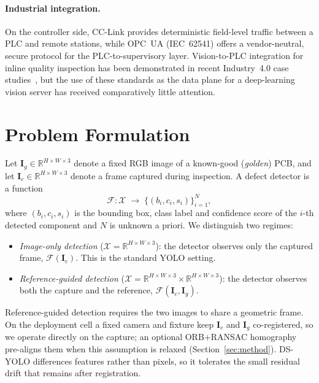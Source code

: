 \documentclass[conference]{IEEEtran}
\newcommand{\R}{\mathbb{R}}
\newcommand{\Igolden}{\mathbf{I}_{\!g}}
\newcommand{\Icap}{\mathbf{I}_{\!c}}
\newcommand{\Net}{\mathcal{F}}
\begin{document}
\paragraph*{Industrial integration.}
On the controller side, CC-Link
\cite{mitsubishi_qj61bt11n_manual} provides deterministic field-level
traffic between a PLC and remote stations, while OPC~UA (IEC~62541)
\cite{iec62541} offers a vendor-neutral, secure protocol for the
PLC-to-supervisory layer. Vision-to-PLC integration for inline quality inspection
has been demonstrated in recent Industry~4.0 case
studies~\cite{maslanka2025visionplc,velesaca2025opcuaml}, but the use of these
standards as the data plane for a deep-learning vision server has received
comparatively little attention.

\section{Problem Formulation}
\label{sec:formulation}

Let $\Igolden\in\R^{H\times W\times 3}$ denote a fixed RGB image of a
known-good (\emph{golden}) PCB, and let $\Icap\in\R^{H\times W\times 3}$
denote a frame captured during inspection. A defect detector is a function
\begin{equation}
\Net : \mathcal{X} \;\longrightarrow\; \bigl\{(b_i, c_i, s_i)\bigr\}_{i=1}^{N},
\label{eq:detector}
\end{equation}
where $(b_i, c_i, s_i)$ is the bounding box, class label and confidence
score of the $i$-th detected component and $N$ is unknown a priori. We
distinguish two regimes:

\begin{itemize}
    \item \emph{Image-only detection} ($\mathcal{X}=\R^{H\times W\times 3}$):
    the detector observes only the captured frame, $\Net(\Icap)$. This is
    the standard YOLO setting.
    \item \emph{Reference-guided detection}
    ($\mathcal{X}=\R^{H\times W\times 3}\!\times\!\R^{H\times W\times 3}$):
    the detector observes both the capture and the reference,
    $\Net(\Icap,\Igolden)$.
\end{itemize}

Reference-guided detection requires the two images to share a geometric frame.
On the deployment cell a fixed camera and fixture keep $\Icap$ and $\Igolden$
co-registered, so we operate directly on the capture; an optional ORB$+$RANSAC
homography pre-aligns them when this assumption is relaxed
(Section~\ref{sec:method}). DS-YOLO differences features rather than pixels, so it
tolerates the small residual drift that remains after registration.
\end{document}
